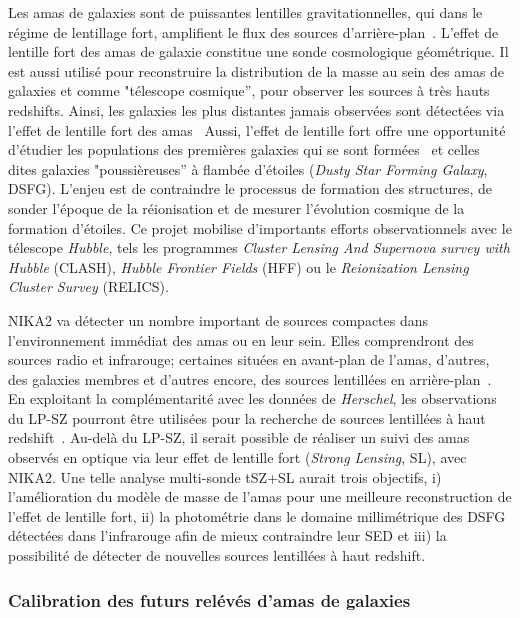 Les amas de galaxies sont de puissantes lentilles gravitationnelles,
qui dans le régime de lentillage fort, amplifient le flux des sources
d'arrière-plan~\citep[voir \emph{e.g.} pour une
  revue][]{Kneib2011}. L'effet de lentille fort des amas de galaxie
constitue une sonde cosmologique géométrique. Il est aussi utilisé
pour reconstruire la distribution de la masse au sein des amas de
galaxies et comme "télescope cosmique'', pour observer les sources à
très hauts redshifts. Ainsi, les galaxies les plus distantes jamais
observées sont détectées via l'effet de lentille fort des
amas~\citep[voir][par exemple]{Salmon2018} Aussi,
l'effet de lentille fort offre une opportunité d'étudier les
populations des premières galaxies qui se sont
formées~\citep[voir][par exemple]{Oesch2018} et celles dites galaxies
"poussièreuses'' à flambée d'étoiles (\emph{Dusty Star Forming
  Galaxy}, DSFG). L'enjeu est de contraindre le processus de formation
des structures, de sonder l'époque de la réionisation et de mesurer
l'évolution cosmique de la formation d'étoiles. Ce projet mobilise
d'importants efforts observationnels avec le télescope \emph{Hubble},
tels les programmes \emph{Cluster Lensing And Supernova survey with
  Hubble} (CLASH), \emph{Hubble Frontier Fields} (HFF) ou le
\emph{Reionization Lensing Cluster Survey} (RELICS).

NIKA2 va détecter un nombre important de sources compactes dans
l'environnement immédiat des amas ou en leur sein. Elles comprendront
des sources radio et infrarouge; certaines situées en avant-plan de
l'amas, d'autres, des galaxies membres et d'autres encore, des sources
lentillées en arrière-plan~\citep{Adam2016, Ruppin2018}. En
exploitant la complémentarité avec les données de \emph{Herschel}, les
observations du LP-SZ pourront être utilisées pour la recherche de
sources lentillées à haut redshift~\citep{Adam2015}. Au-delà du LP-SZ,
il serait possible de réaliser un suivi des amas observés en optique
via leur effet de lentille fort (\emph{Strong Lensing}, SL), avec
NIKA2. Une telle analyse multi-sonde tSZ+SL aurait trois objectifs, i)
l'amélioration du modèle de masse de l'amas pour une meilleure
reconstruction de l'effet de lentille fort, ii) la photométrie dans le
domaine millimétrique des DSFG détectées dans l'infrarouge afin de
mieux contraindre leur SED et iii) la possibilité de détecter de
nouvelles sources lentillées à haut redshift.


\subsubsection{Calibration des futurs relévés d'amas de galaxies}

